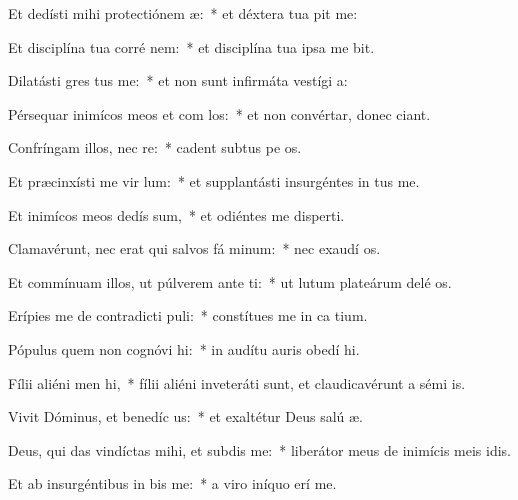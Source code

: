 \item Et dedísti mihi protectiónem  æ:~* et déxtera tua pit me:
\item Et disciplína tua corré   nem:~* et disciplína tua ipsa me bit.
\item Dilatásti gres  tus me:~* et non sunt infirmáta vestígi a:
\item Pérsequar inimícos meos et com los:~* et non convértar, donec ciant.
\item Confríngam illos, nec  re:~* cadent subtus pe os.
\item Et præcinxísti me vir  lum:~* et supplantásti insurgéntes in  tus me.
\item Et inimícos meos dedís  sum,~* et odiéntes me disperti.
\item Clamavérunt, nec erat qui salvos fá  minum:~* nec exaudí os.
\item Et commínuam illos, ut púlverem ante  ti:~* ut lutum plateárum delé os.
\item Erípies me de contradicti puli:~* constítues me in ca tium.
\item Pópulus quem non cognóvi  hi:~* in audítu auris obedí hi.
\item Fílii aliéni men  hi,~* fílii aliéni inveteráti sunt, et claudicavérunt a sémi is.
\item Vivit Dóminus, et benedíc  us:~* et exaltétur Deus salú æ.
\item Deus, qui das vindíctas mihi, et subdis   me:~* liberátor meus de inimícis meis idis.
\item Et ab insurgéntibus in  bis me:~* a viro iníquo erí me.
